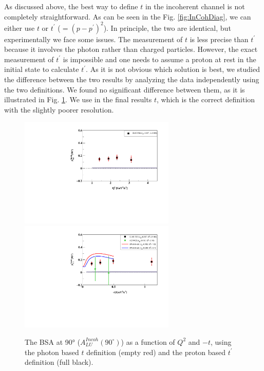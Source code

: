 \documentclass[aps,prc,preprint,superscriptaddress]{revtex4}
\begin{document}
As discussed above, the best way to define $t$ in the incoherent channel is not completely
straightforward. As can be seen in the Fig. \ref{fig:InCohDiag}, 
we can either use $t$ or $t^\prime$ ($= (p - p^\prime)^2$). In principle, the two are 
identical, but experimentally we face some issues. The measurement of $t$ is less precise than
$t^\prime$ because it involves the photon rather than charged particles. However, the 
exact measurement of $t^\prime$ is impossible and one needs to assume a proton at rest
in the initial state to calculate $t^\prime$. As it is not obvious which solution is best,
we studied the difference between the two results by analyzing the data independently using the two 
definitions. We found no significant difference between them, as it is 
illustrated in Fig. \ref{fig:ttpComp}. We use in the final results $t$,
which is the correct definition with the slightly poorer resolution.

\begin{figure}[tbp!]
\center
\includegraphics[width=7.4cm]{fig3/ALU_90_p_vs_Q2_tcomp.pdf}
\includegraphics[width=7.4cm]{fig3/ALU_90_p_vs_t_tcomp.pdf}
	\caption{The BSA at 90° ($A_{LU}^{Incoh} (90^\circ)$) as a
	function of $Q^2$ and $-t$, using the photon based $t$ definition (empty red)
	and the proton based $t^\prime$ definition (full black).}
\label{fig:ttpComp}
\end{figure}
\end{document}
